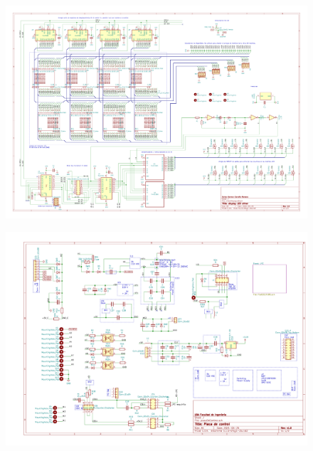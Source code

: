 \begin{figure}[ht]
	\centering
	\includegraphics[width=1\textwidth]{./Figures/output.driverLED.pdf}
	\caption{}
	\label{fig:schDriverLED}
\end{figure}

\begin{figure}[ht]
	\centering
	\includegraphics[width=1\textwidth]{./Figures/output.placaControl.pdf}
	\caption{}
	\label{fig:schController}
\end{figure}